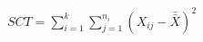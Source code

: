 \documentclass[preview]{standalone}
\begin{document}
\begin{align*}
SCT = \sum_{i=1}^{k} \sum_{j=1}^{n_i} (X_{ij} - \bar{\bar{X}})^2
\end{align*}
\end{document}
